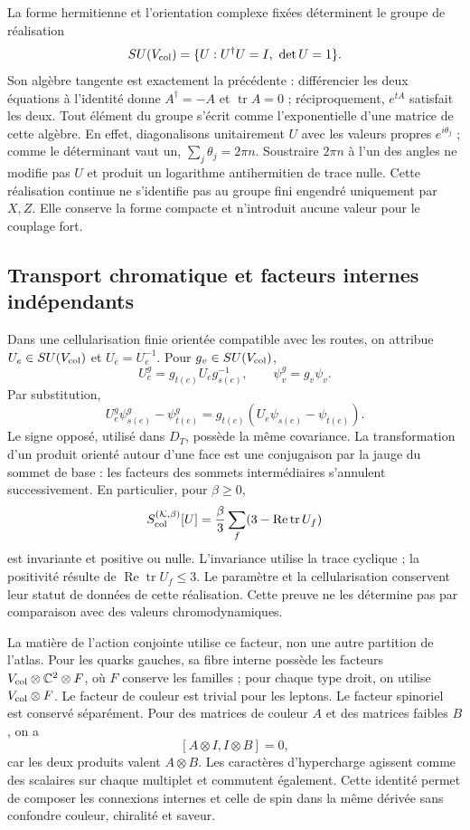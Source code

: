 La forme hermitienne et l’orientation complexe fixées déterminent le groupe de réalisation
\[
 SU(V_{\rm col})=\{U:U^{\dagger}U=I,\ \det U=1\}.
\]
Son algèbre tangente est exactement la précédente : différencier les deux équations à l’identité donne \(A^{\dagger}=-A\) et \(\operatorname{tr}A=0\) ; réciproquement, \(e^{tA}\) satisfait les deux. Tout élément du groupe s’écrit comme l’exponentielle d’une matrice de cette algèbre. En effet, diagonalisons unitairement \(U\) avec les valeurs propres \(e^{i\theta_j}\) ; comme le déterminant vaut un, \(\sum_j\theta_j=2\pi n\). Soustraire \(2\pi n\) à l’un des angles ne modifie pas \(U\) et produit un logarithme antihermitien de trace nulle. Cette réalisation continue ne s’identifie pas au groupe fini engendré uniquement par \(X,Z\). Elle conserve la forme compacte et n’introduit aucune valeur pour le couplage fort.

\subsection{Transport chromatique et facteurs internes indépendants}
\label{hmtcuatro:color:transporte}

Dans une cellularisation finie orientée compatible avec les routes, on attribue \(U_e\in SU(V_{\rm col})\) et \(U_{\bar e}=U_e^{-1}\). Pour \(g_v\in SU(V_{\rm col})\),
\[
 U_e^g=g_{t(e)}U_eg_{s(e)}^{-1},\qquad
 \psi_v^g=g_v\psi_v.
\]
Par substitution,
\[
 U_e^g\psi_{s(e)}^g-\psi_{t(e)}^g
 =g_{t(e)}(U_e\psi_{s(e)}-\psi_{t(e)}).
\]
Le signe opposé, utilisé dans \(D_T\), possède la même covariance. La transformation d’un produit orienté autour d’une face est une conjugaison par la jauge du sommet de base : les facteurs des sommets intermédiaires s’annulent successivement. En particulier, pour \(\beta\ge0\),
\[
 S_{\rm col}^{(\mathcal K,\beta)}[U]
 =\frac\beta3\sum_f(3-\operatorname{Re}\operatorname{tr}U_f)
\]
est invariante et positive ou nulle. L’invariance utilise la trace cyclique ; la positivité résulte de \(\operatorname{Re}\operatorname{tr}U_f\le3\). Le paramètre et la cellularisation conservent leur statut de données de cette réalisation. Cette preuve ne les détermine pas par comparaison avec des valeurs chromodynamiques.

La matière de l’action conjointe utilise ce facteur, non une autre partition de l’atlas. Pour les quarks gauches, sa fibre interne possède les facteurs \(V_{\rm col}\otimes\mathbb C^2\otimes F\), où \(F\) conserve les familles ; pour chaque type droit, on utilise \(V_{\rm col}\otimes F\). Le facteur de couleur est trivial pour les leptons. Le facteur spinoriel est conservé séparément. Pour des matrices de couleur \(A\) et des matrices faibles \(B\), on a
\[
 [A\otimes I,I\otimes B]=0,
\]
car les deux produits valent \(A\otimes B\). Les caractères d’hypercharge agissent comme des scalaires sur chaque multiplet et commutent également. Cette identité permet de composer les connexions internes et celle de spin dans la même dérivée sans confondre couleur, chiralité et saveur.

